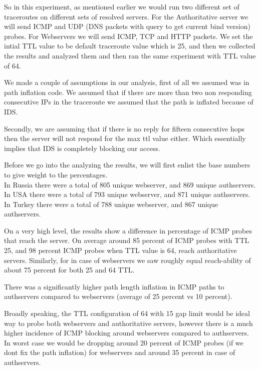 So in this experiment, as mentioned earlier we would run two different set of traceroutes on different sets of resolved servers. For the Authoritative server we will send ICMP and UDP (DNS packets with query to get current bind version) probes. For Webservers we will send ICMP, TCP and HTTP packets. We set the intial TTL value to be default traceroute value which is 25, and then we collected the results and analyzed them and then ran the same experiment with TTL value of 64.

We made a couple of assumptions in our analysis, first of all we assumed was in path inflation code. We assumed that if there are more than two non responding consecutive IPs in the traceroute we assumed that the path is inflated because of IDS. 

Secondly, we are assuming that if there is no reply for fifteen consecutive hops then the server will not respond for the max ttl value either. Which essentially implies that IDS is completely blocking our access.

Before we go into the analyzing the results, we will first enlist the base numbers to give weight to the percentages. \\

In Russia there were a total of 805 unique webserver, and 869 unique authservers.
In USA there were a total of 793 unique webserver, and 871 unique authservers.
In Turkey there were a total of 788 unique webserver, and 867 unique authservers.


On a very high level, the results show a difference in percentage of ICMP probes that reach the server. On average around 85 percent of ICMP probes with TTL 25, and 98 percent ICMP probes when TTL value is 64, reach authoritative servers. Similarly, for in case of webservers we saw roughly equal reach-ability of about 75 percent for both 25 and 64 TTL. 

There was a significantly higher path length inflation in ICMP paths to authservers compared to webservers (average of 25 percent vs 10 percent). 

Broadly speaking, the TTL configuration of 64 with 15 gap limit would be ideal way to probe both webservers and authoritative servers, however there is a much higher incidence of ICMP blocking around webservers compared to authservers. In worst case we would be dropping around 20 percent of ICMP probes (if we dont fix the path inflation) for webservers and around 35 percent in case of authservers.

